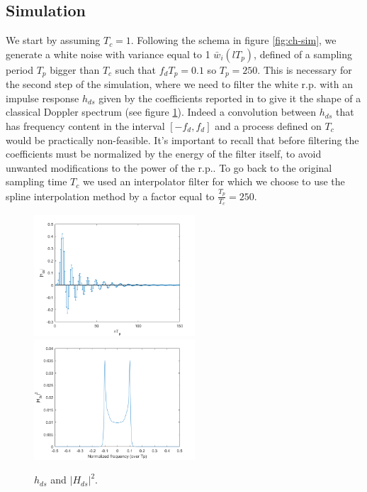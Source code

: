 \documentclass[a4paper,11.5pt]{article}
\begin{document}
\subsection*{Simulation}


We start by assuming $T_c=1$. Following the schema in figure \ref{fig:ch-sim}, we generate a white noise with variance equal to 1 $\bar{w}_i(lT_p)$, defined of a sampling period $T_p$ bigger than $T_c$ such that $f_dT_p=0.1$ so $T_p=250$. This is necessary for the second step of the simulation, where we need to filter the white r.p. with an impulse response $h_{ds}$ given by the coefficients reported in \cite{ananas} to give it the shape of a classical Doppler spectrum (see figure \ref{fig:Ddoppler}). Indeed a convolution between $h_{ds}$ that has frequency content in the interval $[-f_d,f_d]$ and a process defined on $T_c$ would be practically non-feasible. It's important to recall that before filtering the coefficients must be normalized by the energy of the filter itself, to avoid unwanted modifications to the power of the r.p.. To go back to the original sampling time $T_c$ we used an interpolator filter for which we choose to use the spline interpolation method by a factor equal to $\frac{T_p}{T_c}=250$. 

\begin{figure}[ht]
	\begin{center}   
		\includegraphics[width=6cm]{figs/hds.png} 
		\includegraphics[width=6cm]{figs/dpspec.png}
		\caption{$h_{ds}$ and $|H_{ds}|^2$.}
		\label{fig:Ddoppler}
	\end{center}
\end{figure} 
\end{document}
